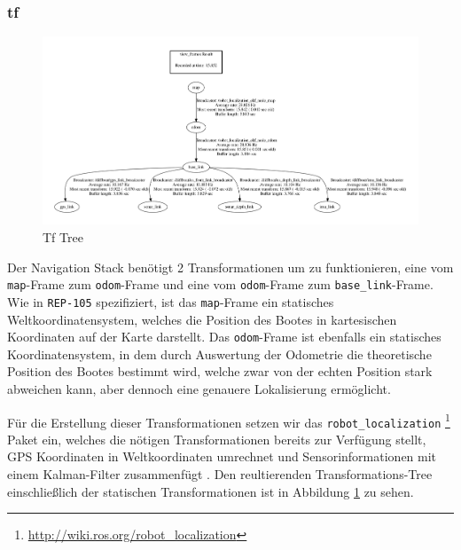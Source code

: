 \documentclass[11pt]{article}
\begin{document}
\subsubsection{tf}

\begin{figure}
	\includegraphics[width=\linewidth]{frames.png}
	\caption{Tf Tree}
	\label{frames}
\end{figure}

Der Navigation Stack benötigt 2 Transformationen um zu funktionieren, eine vom \texttt{map}-Frame zum \texttt{odom}-Frame und eine vom \texttt{odom}-Frame zum \texttt{base\_link}-Frame. Wie in \texttt{REP-105} \cite{REP105} spezifiziert, ist das \texttt{map}-Frame ein statisches Weltkoordinatensystem, welches die Position des Bootes in kartesischen Koordinaten auf der Karte darstellt.  Das \texttt{odom}-Frame ist ebenfalls ein statisches Koordinatensystem, in dem durch Auswertung der Odometrie die theoretische Position des Bootes bestimmt wird, welche zwar von der echten Position stark abweichen kann, aber dennoch eine genauere Lokalisierung ermöglicht.

Für die Erstellung dieser Transformationen setzen wir das \texttt{robot\_localization} \footnote{\url{http://wiki.ros.org/robot_localization}} Paket ein, welches die nötigen Transformationen bereits zur Verfügung stellt, GPS Koordinaten in Weltkoordinaten umrechnet und Sensorinformationen mit einem Kalman-Filter zusammenfügt \cite{MooreStouchKeneralizedEkf2014}. Den reultierenden Transformations-Tree einschließlich der statischen Transformationen ist in Abbildung \ref{frames} zu sehen.\\
\end{document}
